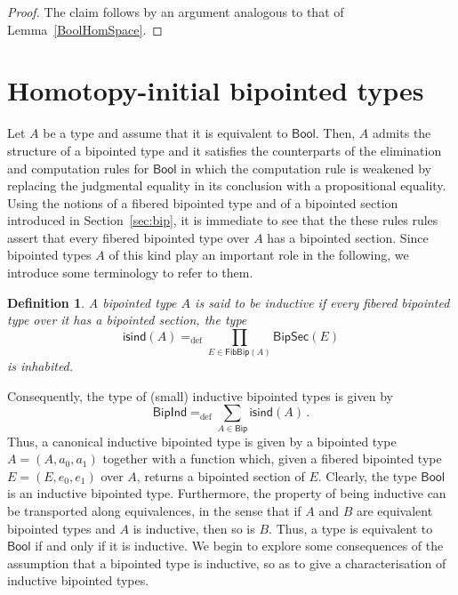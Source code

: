 \documentclass[10pt,a4paper,oneside,reqno]{amsart}
\numberwithin{equation}{section}
\theoremstyle{mythm}
\theoremstyle{mydef}
\newtheorem{definition}[theorem]{Definition}
\theoremstyle{myrmk}
\newcommand{\ie}{\text{i.e.\ }}
\newcommand{\defeq}{=_{\mathrm{def}}}
\newcommand{\Bool}{\mathsf{Bool}}
\newcommand{\Bip}{\mathsf{Bip}}
\newcommand{\FibBip}{\mathsf{FibBip}}
\newcommand{\BipSec}{\mathsf{BipSec}}
\newcommand{\isind}{\mathsf{isind}}
\begin{document}
\begin{proof} The claim follows by an argument analogous to that of Lemma~\ref{BoolHomSpace}.
\end{proof}







\section{Homotopy-initial bipointed types} 



Let $A$ be a type and assume that it is equivalent to $\Bool$. Then, $A$ admits the structure of a bipointed type and
it satisfies the counterparts of the elimination and computation rules for $\Bool$ in which the computation rule is 
weakened by replacing the judgmental equality in its conclusion with a propositional equality. Using the notions of a fibered bipointed type and of a bipointed section introduced in Section~\ref{sec:bip}, it is immediate to see that the these rules rules assert that every fibered bipointed type over $A$ has a bipointed section. Since bipointed types $A$ of this kind  play an important role in the following, we introduce some terminology to refer to them.


 



\begin{definition} A bipointed type $A$ is said to be \emph{inductive} if every fibered bipointed type over it has a bipointed section, \ie the type
\[ 
\isind(A) \defeq \prod_{E \in \FibBip(A)}  \BipSec(E)
\]  
is inhabited. \end{definition} 

Consequently, the type of (small) inductive bipointed types is given by
\[
\mathsf{BipInd} \defeq \sum_{A \in \Bip} \isind(A) \, .
\]
Thus, a canonical inductive bipointed type is given by a bipointed type $A = (A, a_0, a_1)$ together with a function 
which, given a fibered bipointed type $E = (E, e_0, e_1)$ over $A$, returns a bipointed section of $E$.
Clearly, the type $\Bool$ is an inductive bipointed type. Furthermore, the property of being inductive can be transported along equivalences, in the sense that if $A$ and $B$ are equivalent bipointed types and $A$ is inductive, then so is $B$. Thus, a
type is equivalent to $\Bool$ if and only if it is inductive.
We begin to explore some consequences of the assumption that a bipointed type is inductive, so as to give a 
characterisation of inductive bipointed types.
\end{document}
